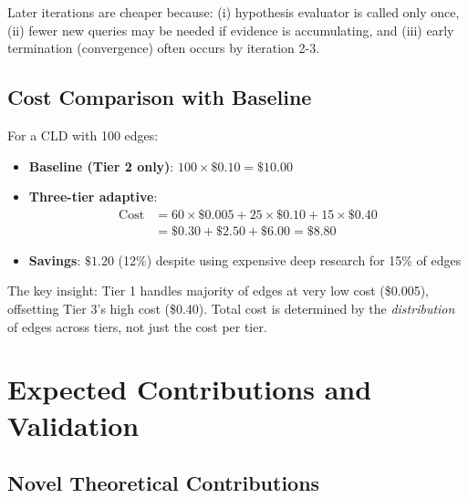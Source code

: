 Later iterations are cheaper because: (i) hypothesis evaluator is called only once, (ii) fewer new queries may be needed if evidence is accumulating, and (iii) early termination (convergence) often occurs by iteration 2-3.

\subsection{Cost Comparison with Baseline}

For a CLD with 100 edges:
\begin{itemize}
    \item \textbf{Baseline (Tier 2 only)}: $100 \times \$0.10 = \$10.00$
    \item \textbf{Three-tier adaptive}:
    \begin{align*}
        \text{Cost} &= 60 \times \$0.005 + 25 \times \$0.10 + 15 \times \$0.40 \\
                    &= \$0.30 + \$2.50 + \$6.00 = \$8.80
    \end{align*}
    \item \textbf{Savings}: $\$1.20$ (12\%) despite using expensive deep research for 15\% of edges
\end{itemize}

The key insight: Tier 1 handles majority of edges at very low cost (\$0.005), offsetting Tier 3's high cost (\$0.40). Total cost is determined by the \textit{distribution} of edges across tiers, not just the cost per tier.

\section{Expected Contributions and Validation}

\subsection{Novel Theoretical Contributions}

